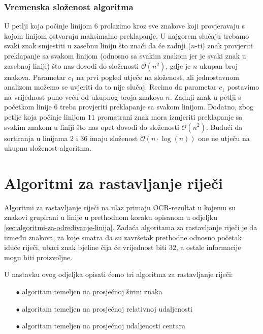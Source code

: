 \documentclass[times, utf8, zavrsni]{fer}
\begin{document}
\subsubsection{Vremenska složenost algoritma}
U petlji koja počinje linijom $6$ prolazimo kroz sve znakove koji provjeravaju
s kojom linijom ostvaruju maksimalno preklapanje. U najgorem slučaju trebamo
svaki znak smjestiti u zasebnu liniju što znači da će zadnji ($n$-ti) znak provjeriti preklapanje sa svakom linijom (odnosno sa svakim znakom jer je svaki znak u zasebnoj liniji) što nas dovodi do složenosti
$\mathcal{O}(n^2)$, gdje je $n$ ukupan broj znakova. Parametar $c_1$ na prvi
pogled utječe na složenost, ali jednostavnom analizom možemo se uvjeriti da to
nije slučaj. Recimo da parametar $c_1$ postavimo na vrijednost
puno veću od ukupnog broja znakova $n$. Zadnji znak u petlji s početkom
linije $6$ treba provjeriti preklapanje sa svakom linijom. Dodatno, zbog petlje
koja počinje linijom $11$ promatrani znak mora izmjeriti preklapanje sa svakim
znakom u liniji što nas opet dovodi do složenosti $\mathcal{O}(n^2)$.
Budući da sortiranja u linijama $2$ i $36$ imaju složenost
$\mathcal{O}(n \cdot \log(n))$ one ne utječu na ukupnu složenost algoritma.








\section{Algoritmi za rastavljanje riječi}
Algoritmi za rastavljanje riječi na ulaz primaju OCR-rezultat u kojemu su
znakovi grupirani u linije u prethodnom koraku opisanom u odjeljku
\ref{sec:algoritmi-za-odredivanje-linija}. Zadaća algoritama za rastavljanje
riječi je da između znakova, za koje smatra da su završetak prethodne odnosno
početak iduće riječi, ubaci znak bjeline čija će vrijednost  biti
$32$, a ostale informacije mogu biti proizvoljne.

U nastavku ovog odjeljka opisati ćemo tri algoritma za rastavljanje riječi:
\begin{itemize}
    \item[$\bullet$] algoritam temeljen na prosječnoj širini znaka
    \item[$\bullet$] algoritam temeljen na prosječnoj relativnoj
                     udaljenosti
    \item[$\bullet$] algoritam temeljen na prosječnoj udaljenosti centara
\end{itemize}
\end{document}
